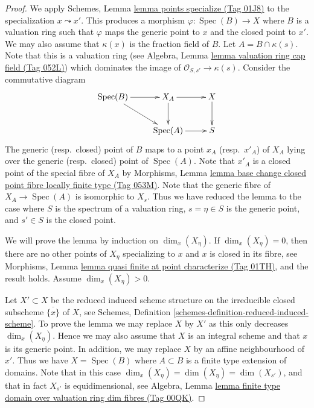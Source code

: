 \documentclass{amsart}
\theoremstyle{plain}
\theoremstyle{definition}
\theoremstyle{remark}
\numberwithin{equation}{subsection}
\def\Spec{\mathop{\mathrm{Spec}}}
\begin{document}
\begin{proof}
We apply
Schemes, Lemma \href{https://stacks.math.columbia.edu/tag/01J8}{lemma points specialize (Tag 01J8)}
to the specialization $x \leadsto x'$.
This produces a morphism $\varphi : \Spec(B) \to X$
where $B$ is a valuation ring such that $\varphi$ maps the
generic point to $x$ and the closed point to $x'$. We may also
assume that $\kappa(x)$ is the fraction field of $B$.
Let $A = B \cap \kappa(s)$. Note that this is a valuation ring (see
Algebra, Lemma \href{https://stacks.math.columbia.edu/tag/052L}{lemma valuation ring cap field (Tag 052L)})
which dominates the image of $\mathcal{O}_{S, s'} \to \kappa(s)$.
Consider the commutative diagram
$$
\xymatrix{
\Spec(B) \ar[rd] \ar[r] &
X_A \ar[d] \ar[r] & X \ar[d] \\
& \Spec(A) \ar[r] & S
}
$$
The generic (resp.\ closed) point of $B$ maps to a point $x_A$
(resp.\ $x'_A$) of $X_A$ lying over the generic (resp.\ closed)
point of $\Spec(A)$. Note that $x'_A$ is a closed point
of the special fibre of $X_A$ by
Morphisms,
Lemma \href{https://stacks.math.columbia.edu/tag/053M}{lemma base change closed point fibre locally finite type (Tag 053M)}.
Note that the generic fibre of $X_A \to \Spec(A)$ is isomorphic
to $X_s$. Thus we have reduced the lemma to the case where $S$ is
the spectrum of a valuation ring, $s = \eta \in S$ is the generic point, and
$s' \in S$ is the closed point.

\medskip\noindent
We will prove the lemma by induction on $\dim_x(X_\eta)$.
If $\dim_x(X_\eta) = 0$, then there are no other points of $X_\eta$
specializing to $x$ and $x$ is closed in its fibre, see
Morphisms, Lemma \href{https://stacks.math.columbia.edu/tag/01TH}{lemma quasi finite at point characterize (Tag 01TH)},
and the result holds. Assume $\dim_x(X_\eta) > 0$.

\medskip\noindent
Let $X' \subset X$ be the reduced induced scheme structure on
the irreducible closed subscheme $\overline{\{x\}}$ of $X$, see
Schemes, Definition \ref{schemes-definition-reduced-induced-scheme}.
To prove the lemma we may replace $X$ by $X'$ as this only decreases
$\dim_x(X_\eta)$. Hence we may also assume that $X$ is an integral scheme
and that $x$ is its generic point. In addition, we may replace $X$ by an
affine neighbourhood of $x'$. Thus we have $X = \Spec(B)$ where
$A \subset B$ is a finite type extension of domains. Note that in
this case $\dim_x(X_\eta) = \dim(X_\eta) = \dim(X_{s'})$, and that in fact
$X_{s'}$ is equidimensional, see
Algebra,
Lemma \href{https://stacks.math.columbia.edu/tag/00QK}{lemma finite type domain over valuation ring dim fibres (Tag 00QK)}.


\end{proof}
\end{document}
